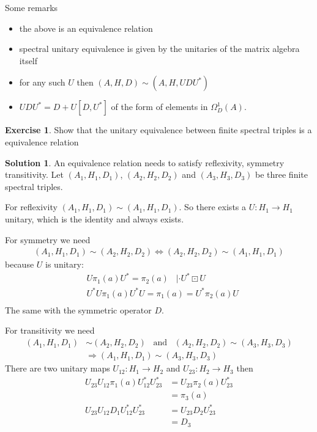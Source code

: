 \documentclass[a4paper]{article}
\theoremstyle{definition}
\theoremstyle{definition}
\theoremstyle{definition}
\theoremstyle{theorem}
\theoremstyle{theorem}
\theoremstyle{theorem}
\newtheorem{exercise}{Exercise}
\theoremstyle{definition}
\newtheorem{solution}{Solution}
\begin{document}
Some remarks
\begin{itemize}
    \item the above is an equivalence relation
    \item spectral unitary equivalence is given by the unitaries of the
        matrix algebra itself
    \item for any such $U$ then $(A, H, D) \sim (A, H, UDU^*)$
    \item $UDU^* = D + U[D, U^*]$ of the form of elements in
        $\Omega _D^1 (A)$.
\end{itemize}

\begin{exercise}
    Show that the unitary equivalence between finite spectral
    triples is a equivalence relation
\end{exercise}

\begin{solution}
    An equivalence relation needs to satisfy reflexivity, symmetry
    transitivity.
    Let $(A_1, H_1, D_1)$, $(A_2, H_2, D_2)$ and $(A_3, H_3, D_3)$
    be three finite spectral triples.
    \newline

    For reflexivity $(A_1, H_1, D_1) \sim (A_1, H_1, D_1)$. So there
    exists a $U: H_1 \rightarrow H_1$ unitary, which is the identity
    and always exists.
    \newline

    For symmetry we need
    \begin{align*}
        (A_1, H_1, D_1) \sim (A_2, H_2, D_2) \Leftrightarrow
        (A_2, H_2, D_2) \sim (A_1, H_1, D_1)
    \end{align*}
    because $U$ is unitary:
    \begin{align*}
        &U\pi_1(a)U^* = \pi_2(a) \;\;\; | \cdot U^*\boxdot U \\
        &U^*U\pi_1(a)U^*U = \pi_1(a) = U^*\pi_2(a)U \\
    \end{align*}
    The same with the symmetric operator $D$.

    \newline
    For transitivity we need
    \begin{align*}
        (A_1, H_1, D_1) &\sim (A_2, H_2, D_2) \;\;\; \text{and} \;\;\;
        (A_2, H_2, D_2) \sim (A_3, H_3, D_3) \\
        &\Rightarrow (A_1, H_1, D_1) \sim (A_3, H_3, D_3)
    \end{align*}
    There are two unitary maps $U_{12}:H_1 \rightarrow H_2$ and
    $U_{23}: H_2 \rightarrow H_3$ then
    \begin{align*}
        U_{23}U_{12} \pi_1(a) U^*_{12}U^*_{23} &= U_{23}
        \pi_2(a) U_23^* \\
        &= \pi_3(a) \\
        U_{23}U_{12} D_1U^*_{12}U^*_{23} &= U_{23}
        D_2 U_23^* \\
        &= D_3
    \end{align*}
\end{solution}
\end{document}
